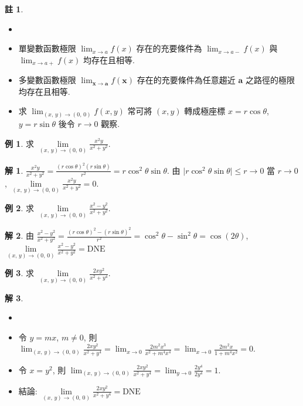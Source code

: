 \documentclass[12pt]{extarticle}
\newcommand{\ds}{\displaystyle}
\theoremstyle{definition}
\newtheorem*{ex}{例}
\newtheorem*{sol}{解}
\newtheorem*{rmk}{註}
\newcommand{\va}{\mathbf{a}}
\newcommand{\vx}{\mathbf{x}}
\begin{document}
\begin{rmk}
  \begin{itemize}\setlength{\itemsep}{0pt}
    \item[]
    \item 單變數函數極限 $\ds\lim_{x\to a} f(x)$ 存在的充要條件為 $\ds\lim_{x\to a-} f(x)$ 與 $\ds\lim_{x\to a+} f(x)$ 均存在且相等. 
    \item 多變數函數極限 $\ds\lim_{\vx\to\va} f(\vx)$ 存在的充要條件為{\color{M4}任意趨近 $\va$ 之路徑的極限}均存在且相等. 
    \item 求 $\ds\lim_{(x,\,y)\to(0,\,0)}f(x, y)$ 常可將 $(x,y)$ 轉成極座標 $\ds x = r\cos\theta$, $\ds y = r\sin\theta$ 後令 $r\to 0$ 觀察. 
  \end{itemize}

\end{rmk}

\begin{ex}
  求 $\ds\lim\limits_{(x,\,y)\to (0,\,0)}\frac{x^2y}{x^2+y^2}$. 
\end{ex}
\begin{sol}
  $\ds\frac{x^2y}{x^2+y^2} =\frac{(r\cos\theta)^2(r\sin\theta)}{r^2} = r\cos^2\theta\sin\theta$. 由 $\ds\big|r\cos^2\theta\sin\theta\big|\leqslant r\to 0$ 當 $r\to 0$, $\ds\lim\limits_{(x,\,y)\to (0,\,0)}\frac{x^2 y}{x^2 + y^2} = 0$. 
\end{sol}

\begin{ex}
  求 $\ds\lim\limits_{(x,\,y)\to (0,\,0)}\frac{x^2 - y^2}{x^2 + y^2}$. 
\end{ex}
\begin{sol}
  由 $\ds\frac{x^2 - y^2}{x^2 + y^2} = \frac{(r\cos\theta)^2 - (r\sin\theta)^2}{r^2} = \cos^2\theta - \sin^2\theta = \cos(2\theta)$, $\ds\lim\limits_{(x,\,y)\to (0,\,0)}\frac{x^2 - y^2}{x^2 + y^2} = \text{DNE}$
\end{sol}

\begin{ex}
  求 $\ds\lim\limits_{(x,\,y)\to (0,\,0)}\frac{2xy^2}{x^2+y^4}$. 
\end{ex}
\begin{sol}
  \begin{itemize}\setlength{\itemsep}{0pt}
    \item[]
    \item 令 $y = mx$, $m\ne 0$, 則 $\ds\lim_{(x,\,y)\to (0,\,0)}\frac{2xy^2}{x^2+y^4} = \lim_{x\to 0}\frac{2m^2x^3}{x^2 + m^4 x^4} = \lim_{x\to 0}\frac{2m^2x}{1 + m^4 x^2} = 0$. 
    \item 令 $x = y^2$, 則 $\ds\lim_{(x,\,y)\to (0,\,0)}\frac{2xy^2}{x^2+y^4} = \lim_{y\to 0}\frac{2y^4}{2y^4} = 1$. 
    \item 結論: $\ds\lim\limits_{(x,\,y)\to(0,\,0)}\frac{2xy^2}{x^2+y^4} = \text{DNE}$
  \end{itemize}
\end{sol}
\end{document}
